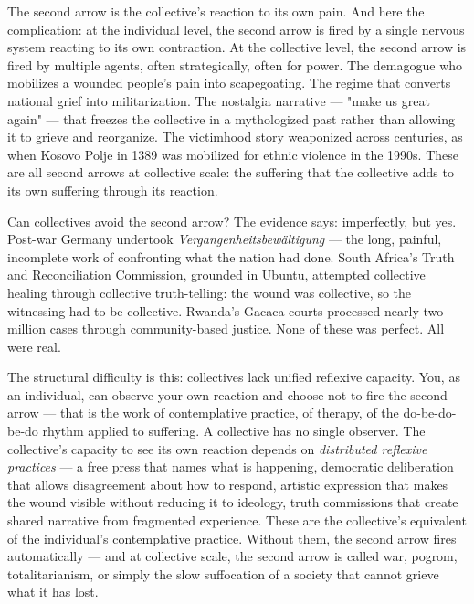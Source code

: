 The second arrow is the collective's reaction to its own pain. And here the complication: at the individual level, the second arrow is fired by a single nervous system reacting to its own contraction. At the collective level, the second arrow is fired by multiple agents, often strategically, often for power. The demagogue who mobilizes a wounded people's pain into scapegoating. The regime that converts national grief into militarization. The nostalgia narrative — "make us great again" — that freezes the collective in a mythologized past rather than allowing it to grieve and reorganize. The victimhood story weaponized across centuries, as when Kosovo Polje in 1389 was mobilized for ethnic violence in the 1990s. These are all second arrows at collective scale: the suffering that the collective adds to its own suffering through its reaction.


Can collectives avoid the second arrow? The evidence says: imperfectly, but yes. Post-war Germany undertook \textit{Vergangenheitsbewältigung} — the long, painful, incomplete work of confronting what the nation had done. South Africa's Truth and Reconciliation Commission, grounded in Ubuntu, attempted collective healing through collective truth-telling: the wound was collective, so the witnessing had to be collective. Rwanda's Gacaca courts processed nearly two million cases through community-based justice. None of these was perfect. All were real.


The structural difficulty is this: collectives lack unified reflexive capacity. You, as an individual, can observe your own reaction and choose not to fire the second arrow — that is the work of contemplative practice, of therapy, of the do-be-do-be-do rhythm applied to suffering. A collective has no single observer. The collective's capacity to see its own reaction depends on \textit{distributed reflexive practices} — a free press that names what is happening, democratic deliberation that allows disagreement about how to respond, artistic expression that makes the wound visible without reducing it to ideology, truth commissions that create shared narrative from fragmented experience. These are the collective's equivalent of the individual's contemplative practice. Without them, the second arrow fires automatically — and at collective scale, the second arrow is called war, pogrom, totalitarianism, or simply the slow suffocation of a society that cannot grieve what it has lost.


